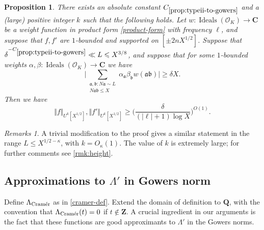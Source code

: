 \documentclass[11pt,reqno]{amsart}
\numberwithin{equation}{section}
\newtheorem{proposition}[theorem]{Proposition}
\theoremstyle{definition}
\theoremstyle{remark}
\newtheorem*{remarks}{Remarks}
\newcommand{\mf}{\mathfrak}
\renewcommand{\le}{\leqslant}
\renewcommand{\ge}{\geqslant}
\newcommand\Z{\mathbf{Z}}
\newcommand\Q{\mathbf{Q}}
\newcommand\C{\mathbf{C}}
\newcommand\cramer{{\textnormal{Cram\'er}}}
\newcommand\Ideals{\operatorname{Ideals}}
\renewcommand\O{\mathcal{O}}
\begin{document}
\begin{proposition}\label{prop:typeii-to-gowers}
There exists an absolute constant $C_{\ref{prop:typeii-to-gowers}}$ and a \textup{(}large\textup{)} positive integer $k$ such that the following holds. Let $w : \Ideals(\O_K) \rightarrow \C$ be a weight function in product form \cref{product-form} with frequency $\ell$, and suppose that $f, f'$ are $1$-bounded and supported on $[\pm 2n X^{1/2}]$. Suppose that $\delta^{-C_{\ref{prop:typeii-to-gowers}}} \ll L \le X^{3/8}$, and suppose that for some $1$-bounded weights $\alpha, \beta : \Ideals(\O_K) \rightarrow \C$ we have
\begin{equation}\label{typeii-assump-cont} \Big| \sum_{\substack{\mf{a}, \mf{b}: N\mf{a} \sim  L \\ N \mf{a}\mf{b} \le X}} \alpha_{\mf{a}} \beta_{\mf{b}} w(\mf{a} \mf{b}) \Big| \ge \delta X.\end{equation}
Then we have
\[ \Vert f \Vert_{U^k[X^{1/2}]}, \Vert f' \Vert_{U^k[X^{1/2}]} \ge \Big(\frac{\delta}{(|\ell|+1) \log X} \Big)^{O(1)} .\] 
\end{proposition}
\begin{remarks}
A trivial modification to the proof gives a similar statement in the range $L \le X^{1/2 - \kappa}$, with $k = O_{\kappa}(1)$. The value of $k$ is extremely large; for further comments see \cref{rmk:height}.
\end{remarks}

\subsection{Approximations to \texorpdfstring{$\Lambda'$}{} in Gowers norm}

Define $\Lambda_{\cramer}$ as in \cref{cramer-def}. Extend the domain of definition to $\Q$, with the convention that $\Lambda_{\cramer}(t) = 0$ if $t \notin \Z$. A crucial ingredient in our arguments is the fact that these functions are good approximants to $\Lambda'$ in the Gowers norms. 
\end{document}
